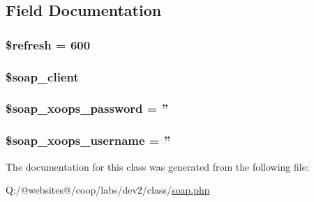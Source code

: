 \subsection{Field Documentation}
\hypertarget{class_s_o_a_p_xortify_exchange_a8527f826b6959aaa92b0e51ee427ba1a}{
\subsubsection[{\$refresh}]{\setlength{\rightskip}{0pt plus 5cm}\$refresh = 600}}\label{class_s_o_a_p_xortify_exchange_a8527f826b6959aaa92b0e51ee427ba1a}
\hypertarget{class_s_o_a_p_xortify_exchange_a18c3d5ef7b606d5f21c8fda9d08e8c7e}{
\subsubsection[{\$soap\-\_\-client}]{\setlength{\rightskip}{0pt plus 5cm}\$soap\-\_\-client}}\label{class_s_o_a_p_xortify_exchange_a18c3d5ef7b606d5f21c8fda9d08e8c7e}
\hypertarget{class_s_o_a_p_xortify_exchange_ac116a126fa48c572acc0a859f42fa8dc}{
\subsubsection[{\$soap\-\_\-xoops\-\_\-password}]{\setlength{\rightskip}{0pt plus 5cm}\$soap\-\_\-xoops\-\_\-password = ''}}\label{class_s_o_a_p_xortify_exchange_ac116a126fa48c572acc0a859f42fa8dc}
\hypertarget{class_s_o_a_p_xortify_exchange_ab46ae973f580890282bce8dbe346abab}{
\subsubsection[{\$soap\-\_\-xoops\-\_\-username}]{\setlength{\rightskip}{0pt plus 5cm}\$soap\-\_\-xoops\-\_\-username = ''}}\label{class_s_o_a_p_xortify_exchange_ab46ae973f580890282bce8dbe346abab}


The documentation for this class was generated from the following file\-:\begin{DoxyCompactItemize}
\item 
Q\-:/@websites@/coop/labs/dev2/class/\hyperlink{soap_8php}{soap.\-php}\end{DoxyCompactItemize}
